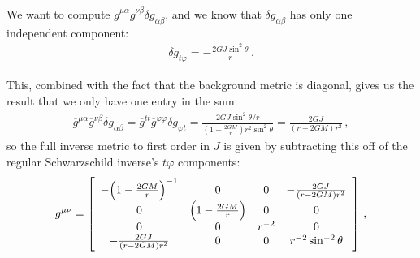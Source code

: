 \documentclass[main.tex]{subfiles}
\begin{document}
We want to compute \(\overline{g}^{\mu \alpha } \overline{g}^{\nu \beta } \delta g_{\alpha \beta }\), and we know that \(\delta g_{\alpha \beta } \) has only one independent component: 
%
\begin{align}
  \delta g_{t \varphi } = - \frac{2 GJ  \sin^2\theta }{r}
\,.
\end{align}

This, combined with the fact that the background metric is diagonal, gives us the result that we only have one entry in the sum: 
%
\begin{align}
  \overline{g}^{\mu \alpha } \overline{g}^{\nu \beta } \delta g_{\alpha \beta }
  = \overline{g}^{tt} \overline{g}^{\varphi \varphi }
  \delta g_{\varphi  t}
  = \frac{2GJ \sin^2 \theta /r }{(1 - \frac{2GM}{r}) r^2 \sin^2 \theta }
  = \frac{2GJ}{(r - 2GM) r^2}
  \,,
\end{align}
%
so the  full inverse metric to first order in \(J\) is given by subtracting this off of the regular Schwarzschild inverse's \(t \varphi \) components: 
%
\begin{align}
  g^{\mu \nu } = \left[\begin{array}{cccc}
    -\qty(1 -\frac{2GM}{r})^{-1}  & 0 & 0 & -\frac{2GJ}{(r - 2GM)r^2} \\ 
    0 & \qty(1- \frac{2GM}{r}) & 0 & 0 \\ 
    0 & 0 & r^{-2} & 0 \\ 
    -\frac{2GJ}{(r - 2GM)r^2} & 0 & 0 & r^{-2} \sin^{-2} \theta 
    \end{array}\right]  
\,,
\end{align}
%
\end{document}
